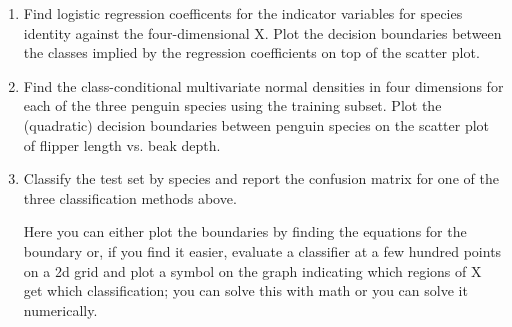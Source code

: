 \documentclass[12pt]{book}
\theoremstyle{definition}
\begin{document}
\begin{enumerate}
\begin{enumerate}[label=(\alph*)]
\item
Find logistic regression coefficents for the indicator variables for species identity against the four-dimensional X. 
Plot the decision boundaries between the classes implied by the regression coefficients on top of the scatter plot.

\item
Find the class-conditional multivariate normal densities in four dimensions for each of the three penguin species using the training subset.
Plot the (quadratic) decision boundaries between penguin species on the scatter plot of flipper length vs. beak depth.

\item
Classify the test set by species and report the confusion matrix for one of the three classification methods above.

Here you can either plot the boundaries by finding the equations for the boundary or, if you find it easier, evaluate a classifier at a few hundred points on a 2d grid and plot a symbol on the graph indicating which regions of X get which classification; you can solve this with math or you can solve it numerically.  
\end{enumerate}










\end{enumerate}
\end{document}
